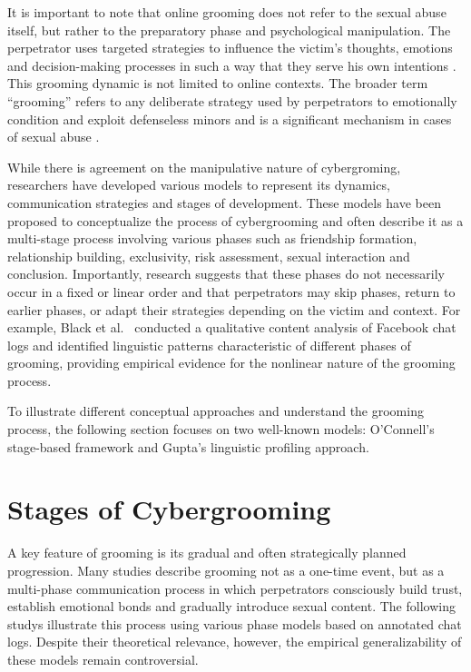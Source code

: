It is important to note that online grooming does not refer to the sexual abuse itself, but rather to the preparatory phase and psychological manipulation. The perpetrator uses targeted strategies to influence the victim's thoughts, emotions and decision-making processes in such a way that they serve his own intentions \parencite{schittenhelm2024cybergrooming}. This grooming dynamic is not limited to online contexts. The broader term “grooming” refers to any deliberate strategy used by perpetrators to emotionally condition and exploit defenseless minors and is a significant mechanism in cases of sexual abuse \parencite{craven2006grooming}.

While there is agreement on the manipulative nature of cybergroming, researchers have developed various models to represent its dynamics, communication strategies and stages of development\parencite{kloess2014online}. These models have been proposed to conceptualize the process of cybergrooming and often describe it as a multi-stage process involving various phases such as friendship formation, relationship building, exclusivity, risk assessment, sexual interaction and conclusion. Importantly, research suggests that these phases do not necessarily occur in a fixed or linear order and that perpetrators may skip phases, return to earlier phases, or adapt their strategies depending on the victim and context. For example, Black et al.\ \parencite{black2015linguistic} conducted a qualitative content analysis of Facebook chat logs and identified linguistic patterns characteristic of different phases of grooming, providing empirical evidence for the nonlinear nature of the grooming process. 

To illustrate different conceptual approaches and understand the grooming process, the following section focuses on two well-known models: O'Connell's stage-based framework and Gupta's linguistic profiling approach. %




\section{Stages of Cybergrooming}

A key feature of grooming is its gradual and often strategically planned progression. Many studies describe grooming not as a one-time event, but as a multi-phase communication process in which perpetrators consciously build trust, establish emotional bonds and gradually introduce sexual content. The following studys illustrate this process using various phase models based on annotated chat logs. Despite their theoretical relevance, however, the empirical generalizability of these models remain controversial.

